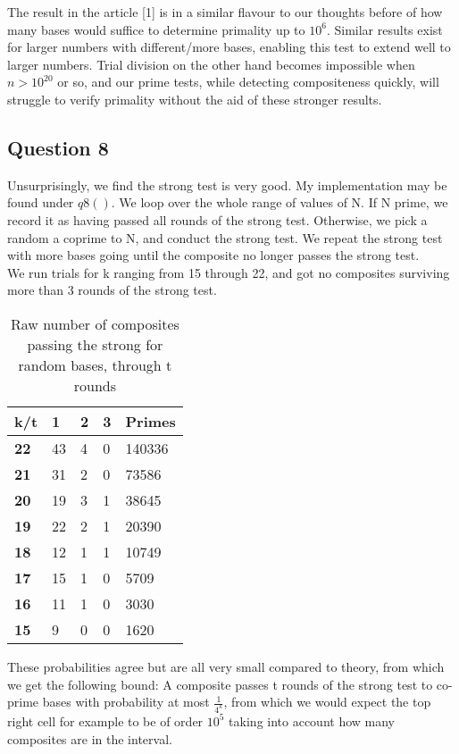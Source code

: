 \documentclass[10pt,a4paper]{report}
\begin{document}
The result in the article [1] is in a similar flavour to our thoughts before of how many bases would suffice to determine primality up to $10^6$. Similar results exist for larger numbers with different/more bases, enabling this test to extend well to larger numbers. Trial division on the other hand becomes impossible when $n>10^{20}$ or so, and our prime tests, while detecting compositeness quickly, will struggle to verify primality without the aid of these stronger results.\\




\subsection*{Question 8}
Unsurprisingly, we find the strong test is very good. My implementation may be found under $q8()$. We loop over the whole range of values of N. If N prime, we record it as having passed all rounds of the strong test. Otherwise, we pick a random a coprime to N, and conduct the strong test. We repeat the strong test with more bases going until the composite no longer passes the strong test.\\

We run trials for k ranging from 15 through 22, and got no composites surviving more than 3 rounds of the strong test.

\begin{table}[h]
\centering
\begin{tabular}{|l|l|l|l|l|}
\hline
\textbf{k/t} & \textbf{1} & \textbf{2} & \textbf{3} & \textbf{Primes} \\ \hline
\textbf{22}  & 43  & 4   & 0   & 140336                    \\ \hline
\textbf{21}  & 31   & 2    & 0    & 73586                     \\ \hline
\textbf{20}  & 19   & 3    & 1    & 38645                     \\ \hline
\textbf{19}  & 22   & 2    & 1   & 20390                     \\ \hline
\textbf{18}  & 12   & 1  & 1    & 10749                     \\ \hline
\textbf{17}  & 15    & 1     & 0     & 5709                      \\ \hline
\textbf{16}  & 11    & 1     & 0     & 3030                      \\ \hline
\textbf{15}  & 9    & 0    & 0     & 1620                      \\ \hline
\end{tabular}
\caption{Raw number of composites passing the strong for random bases, through t rounds}
\end{table}

These probabilities agree but are all very small compared to theory, from which we get the following bound: A composite passes t rounds of the strong test to co-prime bases with probability at most $\frac{1}{4^k}$, from which we would expect the top right cell for example to be of order $10^5$ taking into account how many composites are in the interval.
\end{document}
